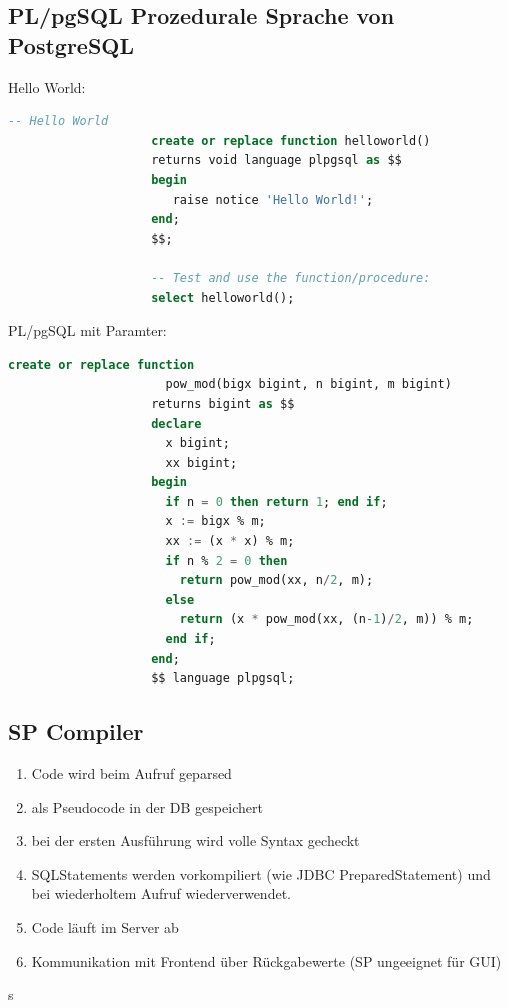 \documentclass[a4paper, landscape, 8pt]{scrartcl}
\begin{document}
\begin{multicols*}{4}
        \section{PL/pgSQL \tiny{Prozedurale Sprache von PostgreSQL}}
        Hello World: \\
        \begin{lstlisting}[language=sql]
                    -- Hello World
                    create or replace function helloworld()
                    returns void language plpgsql as $$
                    begin
                       raise notice 'Hello World!';
                    end;
                    $$;

                    -- Test and use the function/procedure:
                    select helloworld();
        \end{lstlisting}

        PL/pgSQL mit Paramter: \\
        \begin{lstlisting}[language=sql]
                    create or replace function
                      pow_mod(bigx bigint, n bigint, m bigint)
                    returns bigint as $$
                    declare
                      x bigint;
                      xx bigint;
                    begin
                      if n = 0 then return 1; end if;
                      x := bigx % m;
                      xx := (x * x) % m;
                      if n % 2 = 0 then
                        return pow_mod(xx, n/2, m);
                      else
                        return (x * pow_mod(xx, (n-1)/2, m)) % m;
                      end if;
                    end;
                    $$ language plpgsql;
        \end{lstlisting}

        \subsection{SP Compiler}
        \begin{enumerate}
            \item Code wird beim Aufruf geparsed
            \item als Pseudocode in der DB gespeichert
            \item bei der ersten Ausführung wird volle Syntax gecheckt
            \item SQLStatements werden vorkompiliert (wie JDBC PreparedStatement) und bei wiederholtem Aufruf wiederverwendet.
            \item Code läuft im Server ab
            \item Kommunikation mit Frontend über Rückgabewerte (SP ungeeignet für GUI)
        \end{enumerate}s


\end{multicols*}
\end{document}
